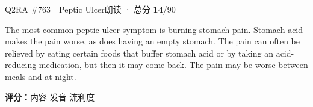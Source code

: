 \begin{qblock}{Q2\quad RA \#763\ \ Peptic Ulcer}{朗读 · 总分 \textcolor{cAccent}{\bfseries 14}/90}
\begin{promptbox}
The most common peptic ulcer symptom is burning stomach pain. Stomach acid makes the pain worse, as does having an empty stomach. The pain can often be relieved by eating certain foods that buffer stomach acid or by taking an acid-reducing medication, but then it may come back. The pain may be worse between meals and at night.
\end{promptbox}
\asrlegend
\begin{asrbox}
    \pse {}            \pse {}    \pse {}   \pse {} \pse {}     \pse {}              \pse {}   \pse {}  \pse {}             
\end{asrbox}
\smallskip
{\small\textbf{评分：}内容  \quad\textperiodcentered\quad 发音  \quad\textperiodcentered\quad 流利度 }
\end{qblock}

